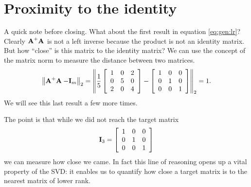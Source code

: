 \section[]{Proximity to the identity}
\label{piproximity}

A quick note before closing. What about the first result in equation \eqref{eq:gen:lr}? Clearly $\leftinv$ is not a left inverse because the product is not an identity matrix. But how ``close'' is this matrix to the identity matrix? We can use the concept of the matrix norm to measure the distance between two matrices. 
\begin{equation}
\normt{\leftinv-\I{m}} = 
\normt{\frac{1}{5}
  \mat{ccc}
  {
 1 & 0 & 2 \\
 0 & 5 & 0 \\
 2 & 0 & 4
  }
  -
  \ithree} = 1.
\end{equation}
We will see this last result a few more times.

The point is that while we did not reach the target matrix 
\begin{equation}
  \I{3} = \ithree
\end{equation}
we can measure how close we came. In fact this line of reasoning opens up a vital property of the SVD: it enables us to quantify how close a target matrix is to the nearest matrix of lower rank.


\endinput
